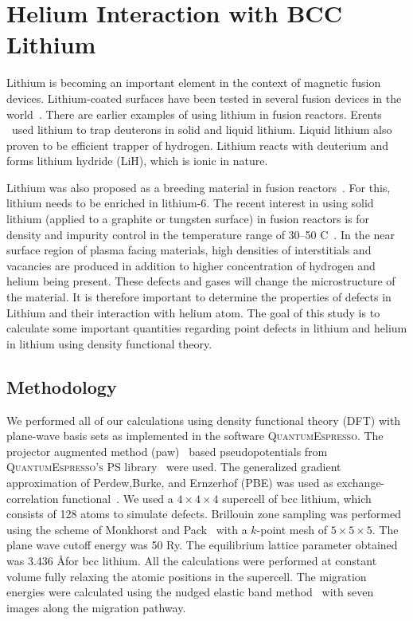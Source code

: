 \chapter{Helium Interaction with BCC Lithium}
Lithium is becoming an important element in the context of magnetic fusion devices. Lithium-coated surfaces have been tested in several fusion devices in the world~\cite{bell2009plasma, mirnov2003li, sanchez2009impact, tuccillo2009overview, xu2011study, munaretto2012rfx}. There are earlier examples of using lithium in fusion reactors. Erents \etal~\cite{erents1971trapping}\@ used lithium to trap deuterons in solid and liquid lithium. Liquid lithium also proven to be efficient trapper of hydrogen. Lithium reacts with deuterium and forms lithium hydride (LiH), which is ionic in nature. 

Lithium was also proposed as a breeding material in fusion reactors~\cite{hartley1978potential}. For this, lithium needs to be enriched in lithium-6. The recent interest in using solid lithium (applied to a graphite or tungsten surface) in fusion reactors is for density and impurity control in the temperature range of 30--50 \textdegree C~\cite{allain2012lithium}.  In the near surface region of plasma facing materials, high densities of interstitials and vacancies are produced in addition to higher concentration of hydrogen and helium being present. These defects and gases will change the microstructure of the material. It is therefore important to determine the properties of defects in Lithium and their interaction with helium atom. The goal of this study is to calculate some important quantities regarding point defects in lithium and helium in lithium using density functional theory.

\section{Methodology}
We performed all of our calculations using density functional theory (DFT) with plane-wave basis sets as implemented in the software \textsc{QuantumEspresso}\cite{giannozzi2009quantum}. The projector augmented method (paw)~\cite{blochl1994projector} based pseudopotentials from \textsc{QuantumEspresso's} PS library~\cite{dal2014pseudopotentials,pp1} were used. The generalized gradient approximation of Perdew,Burke, and Ernzerhof (PBE) was used as exchange-correlation functional~\cite{Perdew1996b, Perdew1997}. We used a $4\times4\times4$ supercell of bcc lithium, which consists of 128 atoms to simulate defects. Brillouin zone sampling was performed using the scheme of Monkhorst and Pack~\cite{pack1977special} with a $k$-point mesh of $5\times5\times5$. The plane wave cutoff energy was 50 Ry. The equilibrium lattice parameter obtained was 3.436 \AA\@ for bcc lithium. All the calculations were performed at constant volume fully relaxing the atomic positions in the supercell. The migration energies were calculated using the nudged elastic band method~\cite{henkelman2000climbing, henkelman2000improved} with seven images along the migration pathway.

